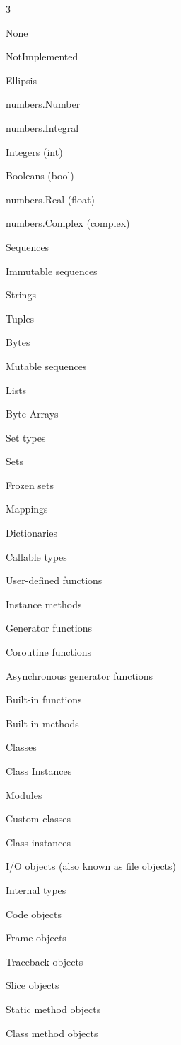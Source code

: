 \documentclass [8pt] {extarticle}
\begin{document}
    \begin {multicols} {3}

    None

    NotImplemented

    Ellipsis

    numbers.Number

    \quad numbers.Integral

    \qquad Integers (int)

    \qquad Booleans (bool)

    \quad numbers.Real (float)

    \quad numbers.Complex (complex)

    Sequences

    \quad Immutable sequences

    \qquad Strings

    \qquad Tuples

    \qquad Bytes

    \quad Mutable sequences

    \qquad Lists

    \qquad Byte-Arrays

    Set types

    \quad Sets

    \quad Frozen sets

    Mappings

    \quad Dictionaries

    Callable types

    \quad User-defined functions

    \quad Instance methods

    \quad Generator functions

    \quad Coroutine functions

    \quad Asynchronous generator functions

    \quad Built-in functions

    \quad Built-in methods

    \quad Classes

    \quad Class Instances

    Modules

    Custom classes

    Class instances

    I/O objects (also known as file objects)

    Internal types

    \quad Code objects

    \quad Frame objects

    \quad Traceback objects

    \quad Slice objects

    \quad Static method objects

    \quad Class method objects

    \end {multicols}
\end{document}
